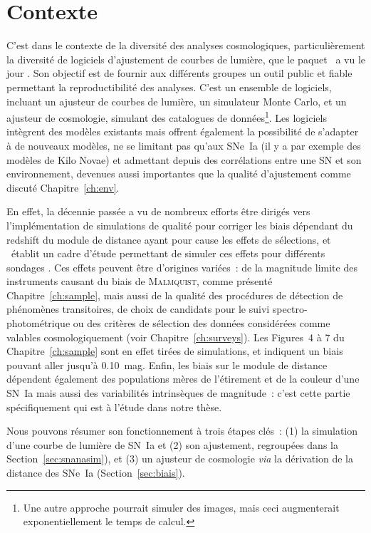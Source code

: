 \documentclass[../main/main.tex]{subfiles}
\begin{document}
\newpage

\section{Contexte}\label{sec:snanacont}

C'est dans le contexte de la diversité des analyses cosmologiques,
particulièrement la diversité de logiciels d'ajustement de courbes de lumière,
que le paquet \snana\ a vu le jour \citep{kessler2009a}. Son objectif est de
fournir aux différents groupes un outil public et fiable permettant la
reproductibilité des analyses. C'est un ensemble de logiciels, incluant un
ajusteur de courbes de lumière, un simulateur Monte Carlo, et un ajusteur de
cosmologie, simulant des catalogues de données\footnote{Une autre approche
    pourrait simuler des images, mais ceci augmenterait exponentiellement le
temps de calcul.}. Les logiciels intègrent des modèles existants mais offrent
également la possibilité de s'adapter à de nouveaux modèles, ne se limitant
pas qu'aux SNe~Ia (il y a par exemple des modèles de Kilo Novae) et
admettant depuis des corrélations entre une SN et son environnement,
devenues aussi importantes que la qualité d'ajustement comme discuté
Chapitre~\ref{ch:env}.

En effet, la décennie passée a vu de nombreux efforts être dirigés vers
l'implémentation de simulations de qualité pour corriger les biais dépendant du
redshift du module de distance ayant pour cause les effets de sélections, et
\snana\ établit un cadre d'étude permettant de simuler ces effets pour
différents sondages \citep{kessler2019}. Ces effets peuvent être d'origines
variées~: de la magnitude limite des instruments causant du biais de
\textsc{Malmquist}, comme présenté Chapitre~\ref{ch:sample}, mais aussi de la
qualité des procédures de détection de phénomènes transitoires, de choix de
candidats pour le suivi spectro-photométrique ou des critères de sélection des
données considérées comme valables cosmologiquement (voir
Chapitre~\ref{ch:surveys}). Les Figures~4 à 7 du Chapitre~\ref{ch:sample} sont
en effet tirées de simulations, et indiquent un biais pouvant aller jusqu'à
\SI{0.10}{mag}. Enfin, les biais sur le module de distance dépendent également
des populations mères de l'étirement et de la couleur d'une SN~Ia mais aussi des
variabilités intrinsèques de magnitude~: c'est cette partie spécifiquement qui
est à l'étude dans notre thèse.

Nous pouvons résumer son fonctionnement à trois étapes clés~: (1) la simulation
d'une courbe de lumière de SN~Ia et (2) son ajustement, regroupées dans la
Section~\ref{sec:snanasim}), et (3) un ajusteur de cosmologie \textit{via} la
dérivation de la distance des SNe~Ia (Section~\ref{sec:biais}).
\end{document}
